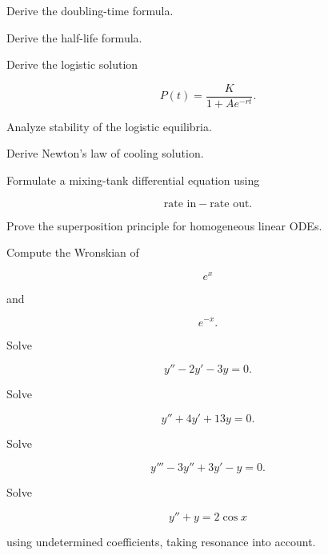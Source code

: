 \begin{exercise}[3]
Derive the doubling-time formula.
\end{exercise}

\begin{exercise}[3]
Derive the half-life formula.
\end{exercise}

\begin{exercise}[3]
Derive the logistic solution

\[
P(t)
=
\frac{
K
}{
1+Ae^{-rt}
}.
\]
\end{exercise}

\begin{exercise}[3]
Analyze stability of the logistic equilibria.
\end{exercise}

\begin{exercise}[3]
Derive Newton's law of cooling solution.
\end{exercise}

\begin{exercise}[3]
Formulate a mixing-tank differential equation using

\[
\text{rate in}
-
\text{rate out}.
\]
\end{exercise}

\begin{exercise}[3]
Prove the superposition principle for homogeneous linear ODEs.
\end{exercise}

\begin{exercise}[3]
Compute the Wronskian of

\[
e^x
\]

and

\[
e^{-x}.
\]
\end{exercise}

\begin{exercise}[3]
Solve

\[
y''-2y'-3y=0.
\]
\end{exercise}

\begin{exercise}[3]
Solve

\[
y''+4y'+13y=0.
\]
\end{exercise}

\begin{exercise}[3]
Solve

\[
y'''-3y''+3y'-y=0.
\]
\end{exercise}

\begin{exercise}[3]
Solve

\[
y''+y=2\cos x
\]

using undetermined coefficients, taking resonance into account.
\end{exercise}

